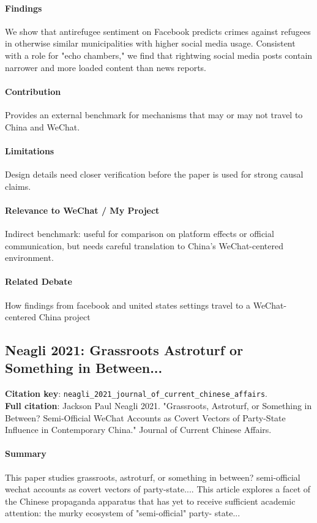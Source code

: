 \documentclass[12pt]{article}
\begin{document}
\paragraph{Findings} We show that antirefugee sentiment on Facebook predicts crimes against refugees in otherwise similar municipalities with higher social media usage. Consistent with a role for "echo chambers," we find that rightwing social media posts contain narrower and more loaded content than news reports.

\paragraph{Contribution} Provides an external benchmark for mechanisms that may or may not travel to China and WeChat.

\paragraph{Limitations} Design details need closer verification before the paper is used for strong causal claims.

\paragraph{Relevance to WeChat / My Project} Indirect benchmark: useful for comparison on platform effects or official communication, but needs careful translation to China's WeChat-centered environment.

\paragraph{Related Debate} How findings from facebook and united states settings travel to a WeChat-centered China project


\subsection{Neagli 2021: Grassroots Astroturf or Something in Between...}
\textbf{Citation key}: \texttt{neagli\_2021\_journal\_of\_current\_chinese\_affairs}.\\
\textbf{Full citation}: Jackson Paul Neagli 2021. "Grassroots, Astroturf, or Something in Between? Semi-Official WeChat Accounts as Covert Vectors of Party-State Influence in Contemporary China." Journal of Current Chinese Affairs.

\paragraph{Summary} This paper studies grassroots, astroturf, or something in between? semi-official wechat accounts as covert vectors of party-state.... This article explores a facet of the Chinese propaganda apparatus that has yet to receive sufficient academic attention: the murky ecosystem of "semi-official" party- state...
\end{document}
